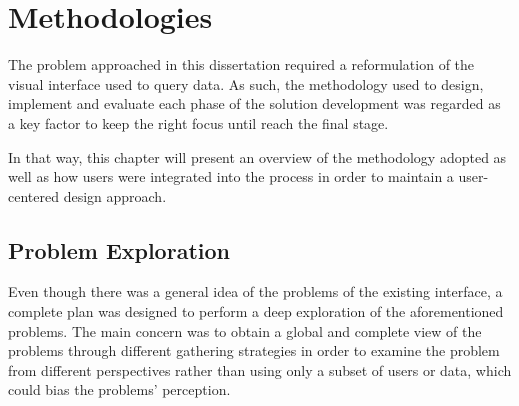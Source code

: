 

\chapter{Methodologies}
\label{cha:methodologies}
The problem approached in this dissertation required a reformulation of the visual interface used to query data. As such, the methodology used to design, implement and evaluate each phase of the solution development was regarded as a key factor to keep the right focus until reach the final stage. 

In that way, this chapter will present an overview of the methodology adopted as well as how users were integrated into the process in order to maintain a user-centered design approach.

\section{Problem Exploration}
\label{sec:problem_exploration}

Even though there was a general idea of the problems of the existing interface, a complete plan was designed to perform a deep exploration of the aforementioned problems. The main concern was to obtain a global and complete view of the problems through different gathering strategies in order to examine the problem from different perspectives rather than using only a subset of users or data, which could bias the problems' perception.


